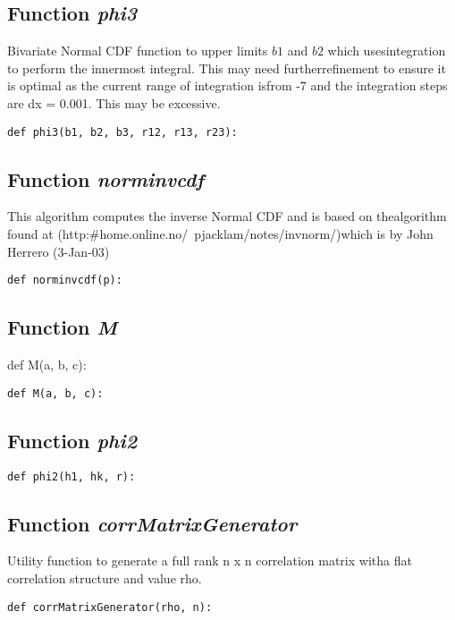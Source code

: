 \documentclass[twoside,11pt]{book}
\begin{document}
\subsection{Function {\it phi3}}
Bivariate Normal CDF function to upper limits $b1$ and $b2$ which usesintegration to perform the innermost integral. This may need furtherrefinement to ensure it is optimal as the current range of integration isfrom -7 and the integration steps are dx = 0.001. This may be excessive. 

\begin{lstlisting}
def phi3(b1, b2, b3, r12, r13, r23):
\end{lstlisting}

\subsection{Function {\it norminvcdf}}
This algorithm computes the inverse Normal CDF and is based on thealgorithm found at (http:\#home.online.no/~pjacklam/notes/invnorm/)which is by John Herrero (3-Jan-03) 

\begin{lstlisting}
def norminvcdf(p):
\end{lstlisting}

\subsection{Function {\it M}}
def M(a, b, c):

\begin{lstlisting}
def M(a, b, c):
\end{lstlisting}

\subsection{Function {\it phi2}}


\begin{lstlisting}
def phi2(h1, hk, r):
\end{lstlisting}

\subsection{Function {\it corrMatrixGenerator}}
Utility function to generate a full rank n x n correlation matrix witha flat correlation structure and value rho. 

\begin{lstlisting}
def corrMatrixGenerator(rho, n):
\end{lstlisting}
\end{document}
